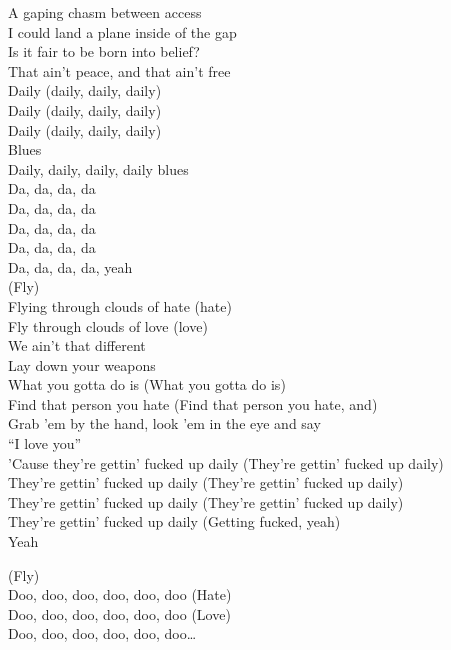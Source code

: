 A gaping chasm between access \\
I could land a plane inside of the gap \\
Is it fair to be born into belief? \\
That ain't peace, and that ain't free \\
Daily (daily, daily, daily) \\
Daily (daily, daily, daily) \\
Daily (daily, daily, daily) \\
Blues \\
Daily, daily, daily, daily blues \\

Da, da, da, da \\
Da, da, da, da \\
Da, da, da, da \\
Da, da, da, da \\
Da, da, da, da, yeah \\

(Fly) \\
Flying through clouds of hate (hate) \\
Fly through clouds of love (love) \\
We ain't that different \\
Lay down your weapons \\
What you gotta do is (What you gotta do is) \\
Find that person you hate (Find that person you hate, and) \\
Grab 'em by the hand, look 'em in the eye and say \\
``I love you'' \\

'Cause they're gettin' fucked up daily (They're gettin' fucked up daily) \\
They're gettin' fucked up daily (They're gettin' fucked up daily) \\
They're gettin' fucked up daily (They're gettin' fucked up daily) \\
They're gettin' fucked up daily (Getting fucked, yeah) \\
Yeah

(Fly) \\
Doo, doo, doo, doo, doo, doo (Hate) \\
Doo, doo, doo, doo, doo, doo (Love) \\
Doo, doo, doo, doo, doo, doo… \\

